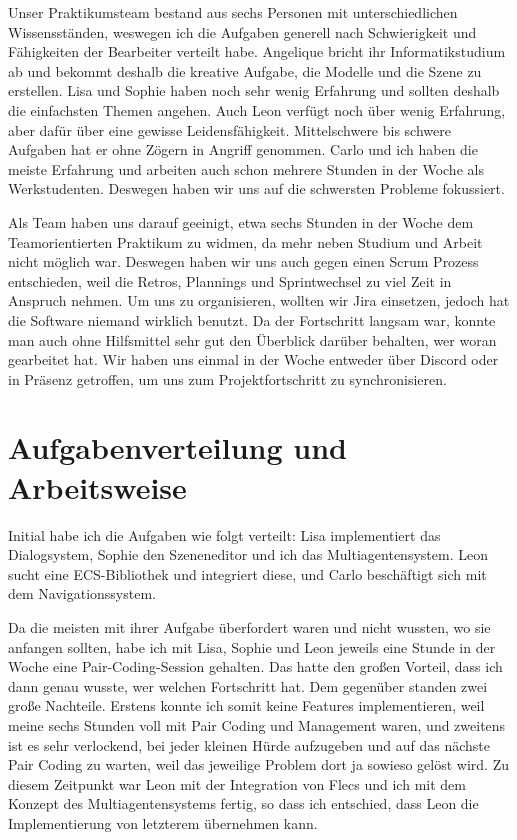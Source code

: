 Unser Praktikumsteam bestand aus sechs Personen mit unterschiedlichen Wissensständen, weswegen ich die Aufgaben generell nach Schwierigkeit und Fähigkeiten der Bearbeiter verteilt habe. Angelique bricht ihr Informatikstudium ab und bekommt deshalb die kreative Aufgabe, die Modelle und die Szene zu erstellen. Lisa und Sophie haben noch sehr wenig Erfahrung und sollten deshalb die einfachsten Themen angehen. Auch Leon verfügt noch über wenig Erfahrung, aber dafür über eine gewisse Leidensfähigkeit. Mittelschwere bis schwere Aufgaben hat er ohne Zögern in Angriff genommen. Carlo und ich haben die meiste Erfahrung und arbeiten auch schon mehrere Stunden in der Woche als Werkstudenten. Deswegen haben wir uns auf die schwersten Probleme fokussiert.

Als Team haben uns darauf geeinigt, etwa sechs Stunden in der Woche dem Teamorientierten Praktikum zu widmen, da mehr neben Studium und Arbeit nicht möglich war. Deswegen haben wir uns auch gegen einen Scrum Prozess entschieden, weil die Retros, Plannings und Sprintwechsel zu viel Zeit in Anspruch nehmen. Um uns zu organisieren, wollten wir Jira einsetzen, jedoch hat die Software niemand wirklich benutzt. Da der Fortschritt langsam war, konnte man auch ohne Hilfsmittel sehr gut den Überblick darüber behalten, wer woran gearbeitet hat. Wir haben uns einmal in der Woche entweder über Discord oder in Präsenz getroffen, um uns zum Projektfortschritt zu synchronisieren.

\section{Aufgabenverteilung und Arbeitsweise}

Initial habe ich die Aufgaben wie folgt verteilt: Lisa implementiert das Dialogsystem, Sophie den Szeneneditor und ich das Multiagentensystem. Leon sucht eine ECS-Bibliothek und integriert diese, und Carlo beschäftigt sich mit dem Navigationssystem.

Da die meisten mit ihrer Aufgabe überfordert waren und nicht wussten, wo sie anfangen sollten, habe ich mit Lisa, Sophie und Leon jeweils eine Stunde in der Woche eine Pair-Coding-Session gehalten. Das hatte den großen Vorteil, dass ich dann genau wusste, wer welchen Fortschritt hat. Dem gegenüber standen zwei große Nachteile. Erstens konnte ich somit keine Features implementieren, weil meine sechs Stunden voll mit Pair Coding und Management waren, und zweitens ist es sehr verlockend, bei jeder kleinen Hürde aufzugeben und auf das nächste Pair Coding zu warten, weil das jeweilige Problem dort ja sowieso gelöst wird.
Zu diesem Zeitpunkt war Leon mit der Integration von Flecs und ich mit dem Konzept des Multiagentensystems fertig, so dass ich entschied, dass Leon die Implementierung von letzterem übernehmen kann.

